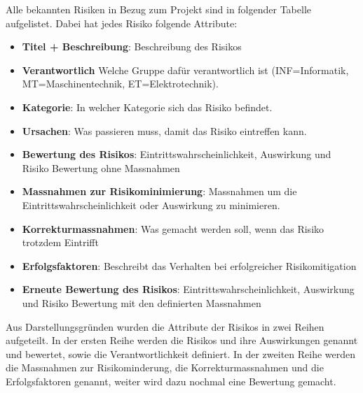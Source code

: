 \documentclass[../main.tex]{subfiles}
\begin{document}
Alle bekannten Risiken in Bezug zum Projekt sind in folgender Tabelle aufgelistet.
Dabei hat jedes Risiko folgende Attribute:
\begin{itemize}
    \item \textbf{Titel + Beschreibung}: Beschreibung des Risikos
    \item \textbf{Verantwortlich} Welche Gruppe dafür verantwortlich ist (INF=Informatik, MT=Maschinentechnik, ET=Elektrotechnik).
    \item \textbf{Kategorie}: In welcher Kategorie sich das Risiko befindet.
    \item \textbf{Ursachen}: Was passieren muss, damit das Risiko eintreffen kann.
    \item \textbf{Bewertung des Risikos}: Eintrittswahrscheinlichkeit, Auswirkung und Risiko Bewertung ohne Massnahmen
    \item \textbf{Massnahmen zur Risikominimierung}: Massnahmen um die Eintrittswahrscheinlichkeit oder Auswirkung zu minimieren.
    \item \textbf{Korrekturmassnahmen}: Was gemacht werden soll, wenn das Risiko trotzdem Eintrifft
    \item \textbf{Erfolgsfaktoren}: Beschreibt das Verhalten bei erfolgreicher Risikomitigation
    \item \textbf{Erneute Bewertung des Risikos}: Eintrittswahrscheinlichkeit, Auswirkung und Risiko Bewertung mit den definierten Massnahmen
\end{itemize}

Aus Darstellungsgründen wurden die Attribute der Risikos in zwei Reihen aufgeteilt. In der ersten Reihe werden die Risikos und ihre Auswirkungen genannt und bewertet, sowie die Verantwortlichkeit definiert. In der zweiten Reihe werden die Massnahmen zur Risikominderung, die Korrekturmassnahmen und die Erfolgsfaktoren genannt, weiter wird dazu nochmal eine Bewertung gemacht.
\end{document}
